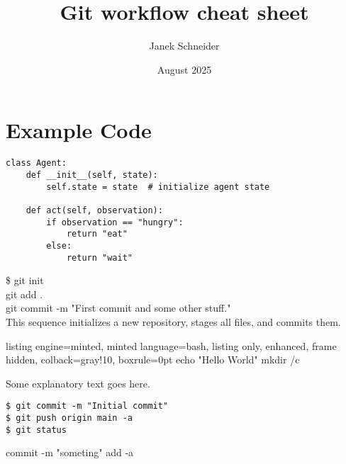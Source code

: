 \documentclass{report}
\title{Git workflow cheat sheet}
\author{Janek Schneider}
\date{August 2025}
\begin{document}
\maketitle

\chapter*{Example Code}
\vspace{1em} %


\begin{lstlisting}[style=python-clean, caption={Example Python code}]
class Agent:
    def __init__(self, state):
        self.state = state  # initialize agent state

    def act(self, observation):
        if observation == "hungry":
            return "eat"
        else:
            return "wait"
\end{lstlisting}


\begin{tcolorbox}[splitBox, listing engine=minted]
\$ git init\\
git add .\\
git commit -m "First commit and some other stuff."\\
\tcblower
This sequence initializes a new repository, stages all files, and commits them.
\end{tcolorbox}

\begin{tcolorbox}[splitBoxCode, title=Example]

\begin{tcblisting}{
    listing engine=minted,
    minted language=bash,
    listing only,
    enhanced,
    frame hidden,
    colback=gray!10,
    boxrule=0pt
}
echo "Hello World"
mkdir /c
\end{tcblisting}

\tcblower
Some explanatory text goes here.
\end{tcolorbox}

\begin{lstlisting}
$ git commit -m "Initial commit"
$ git push origin main -a
$ git status
\end{lstlisting}

\begin{gitBashBox}
commit -m "someting"
add -a
\end{gitBashBox}

\begingroup
\linespread{1}\selectfont
\tableofcontents
\endgroup










\appendix


\end{document}
